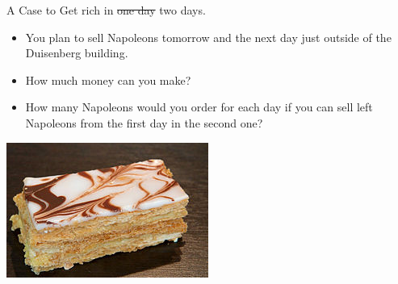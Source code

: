 \begin{question} A Case to  Get rich in \st{one day} two days. 

  \begin{itemize}
  \item You plan to sell Napoleons tomorrow and the next day just outside of the Duisenberg building.
  \item How much money can you make? 
  \item How many Napoleons would you order for each day if you can sell left Napoleons from the first day in the second one?
  \end{itemize}

   \includegraphics[scale = 1.0]{figures/mille-feuille}


\end{question}
